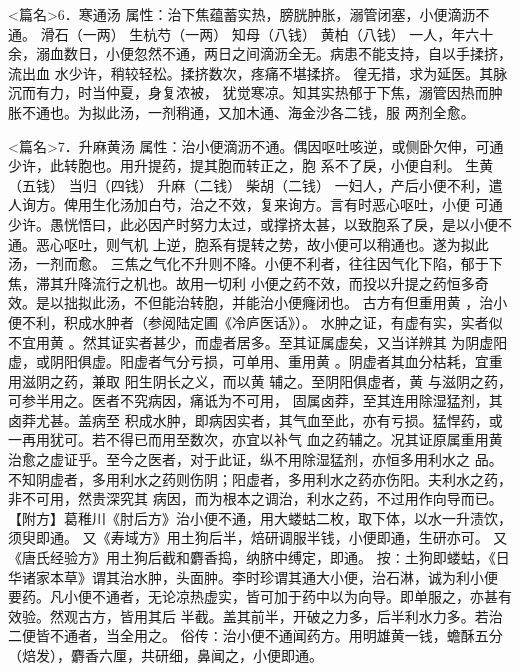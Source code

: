 \documentclass[a4paper,12pt,UTF8,twoside]{ctexbook}
\begin{document}
<篇名>6．寒通汤
属性：治下焦蕴蓄实热，膀胱肿胀，溺管闭塞，小便滴沥不通。 
滑石（一两） 生杭芍（一两） 知母（八钱） 黄柏（八钱） 
一人，年六十余，溺血数日，小便忽然不通，两日之间滴沥全无。病患不能支持，自以手揉挤，流出血 
水少许，稍较轻松。揉挤数次，疼痛不堪揉挤。 徨无措，求为延医。其脉沉而有力，时当仲夏，身复浓被， 
犹觉寒凉。知其实热郁于下焦，溺管因热而肿胀不通也。为拟此汤，一剂稍通，又加木通、海金沙各二钱，服 
两剂全愈。 


<篇名>7．升麻黄汤
属性：治小便滴沥不通。偶因呕吐咳逆，或侧卧欠伸，可通少许，此转胞也。用升提药，提其胞而转正之，胞 
系不了戾，小便自利。 
生黄 （五钱） 当归（四钱） 升麻（二钱） 柴胡（二钱） 
一妇人，产后小便不利，遣人询方。俾用生化汤加白芍，治之不效，复来询方。言有时恶心呕吐，小便 
可通少许。愚恍悟曰，此必因产时努力太过，或撑挤太甚，以致胞系了戾，是以小便不通。恶心呕吐，则气机 
上逆，胞系有提转之势，故小便可以稍通也。遂为拟此汤，一剂而愈。 
三焦之气化不升则不降。小便不利者，往往因气化下陷，郁于下焦，滞其升降流行之机也。故用一切利 
小便之药不效，而投以升提之药恒多奇效。是以拙拟此汤，不但能治转胞，并能治小便癃闭也。 
古方有但重用黄 ，治小便不利，积成水肿者（参阅陆定圃《冷庐医话》）。 
水肿之证，有虚有实，实者似不宜用黄 。然其证实者甚少，而虚者居多。至其证属虚矣，又当详辨其 
为阴虚阳虚，或阴阳俱虚。阳虚者气分亏损，可单用、重用黄 。阴虚者其血分枯耗，宜重用滋阴之药，兼取 
阳生阴长之义，而以黄 辅之。至阴阳俱虚者，黄 与滋阴之药，可参半用之。医者不究病因，痛诋为不可用， 
固属卤莽，至其连用除湿猛剂，其卤莽尤甚。盖病至 
积成水肿，即病因实者，其气血至此，亦有亏损。猛悍药，或一再用犹可。若不得已而用至数次，亦宜以补气 
血之药辅之。况其证原属重用黄 治愈之虚证乎。至今之医者，对于此证，纵不用除湿猛剂，亦恒多用利水之 
品。不知阴虚者，多用利水之药则伤阴；阳虚者，多用利水之药亦伤阳。夫利水之药，非不可用，然贵深究其 
病因，而为根本之调治，利水之药，不过用作向导而已。 
【附方】葛稚川《肘后方》治小便不通，用大蝼蛄二枚，取下体，以水一升渍饮，须臾即通。 
又《寿域方》用土狗后半，焙研调服半钱，小便即通，生研亦可。 
又《唐氏经验方》用土狗后截和麝香捣，纳脐中缚定，即通。 
按∶土狗即蝼蛄，《日华诸家本草》谓其治水肿，头面肿。李时珍谓其通大小便，治石淋，诚为利小便 
要药。凡小便不通者，无论凉热虚实，皆可加于药中以为向导。即单服之，亦甚有效验。然观古方，皆用其后 
半截。盖其前半，开破之力多，后半利水力多。若治二便皆不通者，当全用之。 
俗传∶治小便不通闻药方。用明雄黄一钱，蟾酥五分（焙发），麝香六厘，共研细，鼻闻之，小便即通。 
\end{document}
